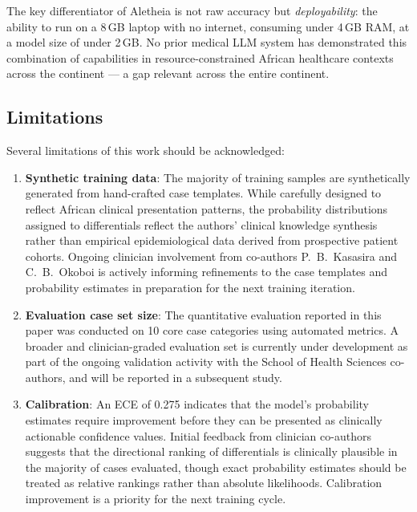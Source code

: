 \documentclass[journal]{IEEEtran}
\begin{document}
The key differentiator of Aletheia is not raw accuracy but
\textit{deployability}: the ability to run on a 8\,GB laptop
with no internet, consuming under 4\,GB RAM, at a model size of
under 2\,GB. No prior medical LLM system has demonstrated this
combination of capabilities in resource-constrained African healthcare contexts
across the continent --- a gap relevant across the entire continent.

\subsection{Limitations}

Several limitations of this work should be acknowledged:

\begin{enumerate}
  \item \textbf{Synthetic training data}: The majority of training
        samples are synthetically generated from hand-crafted case
        templates. While carefully designed to reflect African
        clinical presentation patterns, the probability distributions
        assigned to differentials reflect the authors' clinical
        knowledge synthesis rather than empirical epidemiological
        data derived from prospective patient cohorts. Ongoing
        clinician involvement from co-authors P.~B.~Kasasira and
        C.~B.~Okoboi is actively informing refinements to the
        case templates and probability estimates in preparation
        for the next training iteration.

  \item \textbf{Evaluation case set size}: The quantitative
        evaluation reported in this paper was conducted on 10 core
        case categories using automated metrics. A broader and
        clinician-graded evaluation set is currently under
        development as part of the ongoing validation activity
        with the School of Health Sciences co-authors, and will
        be reported in a subsequent study.

  \item \textbf{Calibration}: An ECE of 0.275 indicates that the
        model's probability estimates require improvement before
        they can be presented as clinically actionable confidence
        values. Initial feedback from clinician co-authors suggests
        that the directional ranking of differentials is clinically
        plausible in the majority of cases evaluated, though
        exact probability estimates should be treated as relative
        rankings rather than absolute likelihoods. Calibration
        improvement is a priority for the next training cycle.


\end{enumerate}
\end{document}
